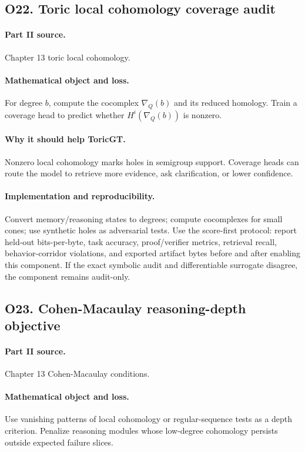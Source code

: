 \documentclass[11pt]{article}
\theoremstyle{definition}
\begin{document}
\subsection{O22. Toric local cohomology coverage audit}
\paragraph{Part II source.} Chapter 13 toric local cohomology.
\paragraph{Mathematical object and loss.} For degree $b$, compute the cocomplex $\nabla_Q(b)$ and its reduced homology.  Train a coverage head to predict whether $H^i(\nabla_Q(b))$ is nonzero.
\paragraph{Why it should help ToricGT.} Nonzero local cohomology marks holes in semigroup support.  Coverage heads can route the model to retrieve more evidence, ask clarification, or lower confidence.
\paragraph{Implementation and reproducibility.} Convert memory/reasoning states to degrees; compute cocomplexes for small cones; use synthetic holes as adversarial tests.  Use the score-first protocol: report held-out bits-per-byte, task accuracy, proof/verifier metrics, retrieval recall, behavior-corridor violations, and exported artifact bytes before and after enabling this component.  If the exact symbolic audit and differentiable surrogate disagree, the component remains audit-only.


\subsection{O23. Cohen-Macaulay reasoning-depth objective}
\paragraph{Part II source.} Chapter 13 Cohen-Macaulay conditions.
\paragraph{Mathematical object and loss.} Use vanishing patterns of local cohomology or regular-sequence tests as a depth criterion.  Penalize reasoning modules whose low-degree cohomology persists outside expected failure slices.
\end{document}
